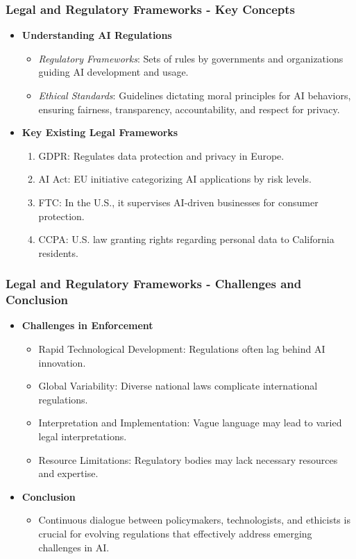 \documentclass{beamer}
\begin{document}
\begin{frame}[fragile]
    \frametitle{Legal and Regulatory Frameworks - Key Concepts}
    \begin{itemize}
        \item \textbf{Understanding AI Regulations}
        \begin{itemize}
            \item \textit{Regulatory Frameworks}: Sets of rules by governments and organizations guiding AI development and usage.
            \item \textit{Ethical Standards}: Guidelines dictating moral principles for AI behaviors, ensuring fairness, transparency, accountability, and respect for privacy.
        \end{itemize}
        
        \item \textbf{Key Existing Legal Frameworks}
        \begin{enumerate}
            \item GDPR: Regulates data protection and privacy in Europe.
            \item AI Act: EU initiative categorizing AI applications by risk levels.
            \item FTC: In the U.S., it supervises AI-driven businesses for consumer protection.
            \item CCPA: U.S. law granting rights regarding personal data to California residents.
        \end{enumerate}
    \end{itemize}
\end{frame}

\begin{frame}[fragile]
    \frametitle{Legal and Regulatory Frameworks - Challenges and Conclusion}
    \begin{itemize}
        \item \textbf{Challenges in Enforcement}
        \begin{itemize}
            \item Rapid Technological Development: Regulations often lag behind AI innovation.
            \item Global Variability: Diverse national laws complicate international regulations.
            \item Interpretation and Implementation: Vague language may lead to varied legal interpretations.
            \item Resource Limitations: Regulatory bodies may lack necessary resources and expertise.
        \end{itemize}
        
        \item \textbf{Conclusion}
        \begin{itemize}
            \item Continuous dialogue between policymakers, technologists, and ethicists is crucial for evolving regulations that effectively address emerging challenges in AI.
        \end{itemize}
    \end{itemize}
\end{frame}
\end{document}
